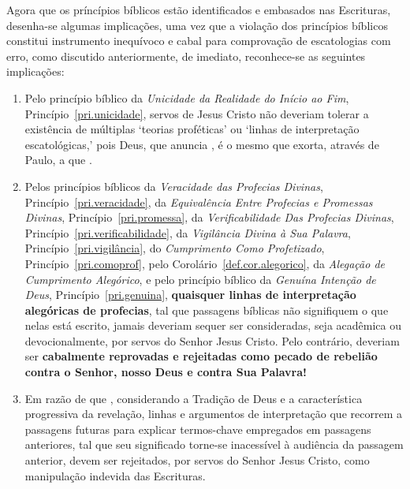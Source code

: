     Agora que os príncípios bíblicos estão identificados e embasados nas Escrituras, desenha-se algumas implicações, uma vez que
    a violação dos princípios bíblicos constitui instrumento inequívoco e cabal para comprovação de escatologias com erro,  como
    discutido anteriormente, de imediato, reconhece-se as seguintes implicações:

    \begin{enumerate}

        \item   Pelo   princípio   bíblico   da    \emph{Unicidade    da    Realidade    do    Início    ao    Fim},
            Princípio~\ref{pri.unicidade}, servos de Jesus Cristo não deveriam tolerar  a  existência  de  múltiplas
            `teorias proféticas' ou `linhas de interpretação escatológicas,' pois Deus, que anuncia ,
            é o mesmo que exorta, através de Paulo, a que .

        \item Pelos princípios bíblicos da \emph{Veracidade das Profecias Divinas},  Princípio~\ref{pri.veracidade},
            da  \emph{Equivalência  Entre  Profecias  e   Promessas   Divinas},   Princípio~\ref{pri.promessa},   da
            \emph{Verificabilidade Das Profecias Divinas}, Princípio~\ref{pri.verificabilidade}, da \emph{Vigilância
            Divina  à  Sua  Palavra},  Princípio~\ref{pri.vigilância},  do  \emph{Cumprimento   Como   Profetizado},
            Princípio~\ref{pri.comoprof}, pelo Corolário~\ref{def.cor.alegorico}, da \emph{Alegação  de  Cumprimento
            Alegórico}, e pelo princípio bíblico da \emph{Genuína Intenção  de  Deus},  Princípio~\ref{pri.genuina},
            \textbf{quaisquer linhas de interpretação alegóricas de  profecias},  tal  que  passagens  bíblicas  não
            signifiquem o que nelas está escrito,  jamais  deveriam  sequer  ser  consideradas,  seja  acadêmica  ou
            devocionalmente, por servos do Senhor Jesus Cristo.  Pelo  contrário,  deveriam  ser  \textbf{cabalmente
            reprovadas e rejeitadas como pecado de rebelião contra o Senhor, nosso Deus e contra Sua Palavra!}

        \item Em razão de que ,  considerando  a  Tradição  de  Deus  e  a
            característica progressiva da revelação, linhas e argumentos de interpretação que recorrem  a  passagens
            futuras para explicar termos-chave empregados em passagens anteriores, tal que seu significado  torne-se
            inacessível à audiência da passagem anterior, devem ser rejeitados, por servos do Senhor  Jesus  Cristo,
            como manipulação indevida das Escrituras.

    \end{enumerate}

